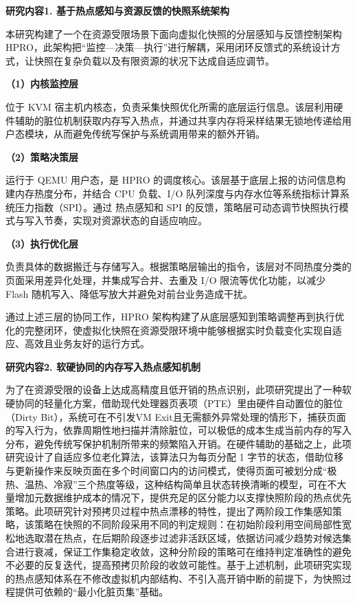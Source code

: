 \textbf{研究内容1. 基于热点感知与资源反馈的快照系统架构}

本研究构建了一个在资源受限场景下面向虚拟化快照的分层感知与反馈控制架构 HPRO，此架构把“监控—决策—执行”进行解耦，采用闭环反馈式的系统设计方式，让快照在复杂负载以及有限资源的状况下达成自适应调节。

\textbf{（1）内核监控层}

位于 KVM 宿主机内核态，负责采集快照优化所需的底层运行信息。该层利用硬件辅助的脏位机制获取内存写入热点，并通过共享内存将采样结果无锁地传递给用户态模块，从而避免传统写保护与系统调用带来的额外开销。

\textbf{（2）策略决策层}

运行于 QEMU 用户态，是 HPRO 的调度核心。该层基于底层上报的访问信息构建内存热度分布，并结合 CPU 负载、I/O 队列深度与内存水位等系统指标计算系统压力指数（SPI）。通过 热点感知和 SPI 的反馈，策略层可动态调节快照执行模式与写入节奏，实现对资源状态的自适应响应。

\textbf{（3）执行优化层}

负责具体的数据搬迁与存储写入。根据策略层输出的指令，该层对不同热度分类的页面采用差异化处理，并集成写合并、去重及 I/O 限流等优化功能，以减少 Flash 随机写入、降低写放大并避免对前台业务造成干扰。

通过上述三层的协同工作，HPRO 架构构建了从底层感知到策略调整再到执行优化的完整闭环，使虚拟化快照在资源受限环境中能够根据实时负载变化实现自适应、高效且业务友好的运行方式。

\textbf{研究内容2. 软硬协同的内存写入热点感知机制}

为了在资源受限的设备上达成高精度且低开销的热点识别，此项研究提出了一种软硬协同的轻量化方案，借助现代处理器页表项（PTE）里由硬件自动置位的脏位（Dirty Bit），系统可在不引发VM Exit且无需额外异常处理的情形下，捕获页面的写入行为，依靠周期性地扫描并清除脏位，可以极低的成本生成当前内存的写入分布，避免传统写保护机制所带来的频繁陷入开销。在硬件辅助的基础之上，此项研究设计了自适应多位老化算法，该算法只为每页分配 1 字节的状态，借助位移与更新操作来反映页面在多个时间窗口内的访问模式，使得页面可被划分成“极热、温热、冷寂”三个热度等级，这种结构简单且状态转换清晰的模型，可在不大量增加元数据维护成本的情况下，提供充足的区分能力以支撑快照阶段的热点优先策略。此项研究针对预拷贝过程中热点漂移的特性，提出了两阶段工作集感知策略，该策略在快照的不同阶段采用不同的判定规则：在初始阶段利用空间局部性宽松地选取潜在热点，在后期阶段逐步过滤非活跃区域，依据访问减少趋势对候选集合进行衰减，保证工作集稳定收敛，这种分阶段的策略可在维持判定准确性的避免不必要的反复迭代，提高预拷贝阶段的收敛可能性。基于上述机制，此项研究实现的热点感知体系在不修改虚拟机内部结构、不引入高开销中断的前提下，为快照过程提供可依赖的“最小化脏页集”基础。

